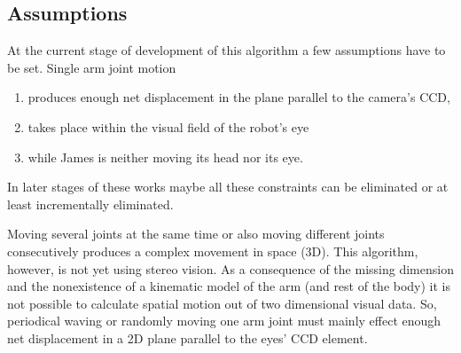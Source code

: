 \subsection{Assumptions}\label{method:localization:assumptions}
At the current stage of development of this algorithm a few assumptions 
have to be set. Single arm joint motion
\begin{enumerate}
	\item produces enough net displacement in the plane parallel to the camera's CCD,
	\item takes place within the visual field of the robot's eye
	\item while James is neither moving its head nor its eye.
\end{enumerate}
In later stages of these works maybe all these constraints can be eliminated or 
at least incrementally eliminated.

Moving several joints at the same time or also moving different joints consecutively 
produces a complex movement in space (3D). This algorithm, however, is not yet using 
stereo vision. As a consequence of the missing dimension and the nonexistence of a kinematic 
model of the arm (and rest of the body) it is not possible to calculate spatial motion 
out of two dimensional visual data. So, periodical waving or randomly moving one arm 
joint must mainly effect enough net displacement in a 2D plane parallel to the eyes' CCD element. 
%
%
%
%
